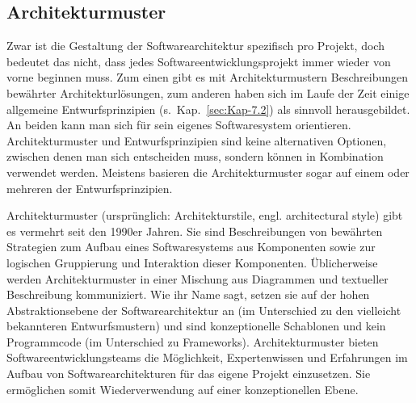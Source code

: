 \subsection{Architekturmuster}
\label{sec:Kap-7.1.2}

Zwar ist die Gestaltung der Softwarearchitektur spezifisch pro Projekt, doch bedeutet das nicht, dass jedes Softwareentwicklungsprojekt immer wieder von vorne beginnen muss. Zum einen gibt es mit Architekturmustern Beschreibungen bewährter Architekturlösungen, zum anderen haben sich im Laufe der Zeit einige allgemeine Entwurfsprinzipien (s.~Kap.~\ref{sec:Kap-7.2}) als sinnvoll herausgebildet. An beiden kann man sich für sein eigenes Softwaresystem orientieren. Architekturmuster und Entwurfsprinzipien sind keine alternativen Optionen, zwischen denen man sich entscheiden muss, sondern können in Kombination verwendet werden. Meistens basieren die Architektur\-muster sogar auf einem oder mehreren der Entwurfsprinzipien.

Architekturmuster (ursprünglich: Architekturstile, engl. architectural style) gibt es vermehrt seit den 1990er Jahren. Sie sind Beschreibungen von bewährten Strategien zum Aufbau eines Softwaresystems aus Komponenten sowie zur logischen Gruppierung und Interaktion dieser Komponenten. Üblicherweise werden Architekturmuster in einer Mischung aus Diagrammen und textueller Beschreibung kommuniziert. Wie ihr Name sagt, setzen sie auf der hohen Abstraktionsebene der Software\-architektur an (im Unterschied zu den vielleicht bekannteren Entwurfs\-mustern) und sind konzeptionelle Schablonen und kein Programmcode (im Unterschied zu Frameworks). Architektur\-muster bieten Softwareentwicklungsteams die Möglichkeit, Experten\-wissen und Erfahrungen im Aufbau von Softwarearchitekturen für das eigene Projekt einzusetzen. Sie ermöglichen somit Wiederverwendung auf einer konzeptionellen Ebene. 

